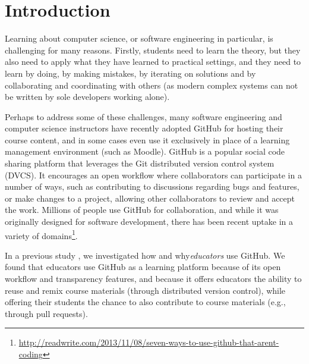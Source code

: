 \section{Introduction}


Learning about computer science, or software engineering in particular, is challenging for many reasons.  Firstly, students need to learn the theory, but they also need to apply what they have learned to practical settings, and they need to learn by doing, by making mistakes, by iterating on solutions and by collaborating and coordinating with others (as modern complex systems can not be written by sole developers working alone). 

Perhaps to address some of these challenges, many software engineering and computer science instructors have recently adopted GitHub for hosting their course content, and in some cases even use it exclusively in place of a learning management environment (such as Moodle).
%
GitHub is a popular social code sharing platform that leverages the Git distributed version control system (DVCS). It encourages an open workflow where collaborators can participate in a number of ways, such as contributing to discussions regarding bugs and features, or make changes to a project, allowing other collaborators to review and accept the work.  Millions of people use GitHub for collaboration, and while it was originally designed for software development, there has been recent uptake in a variety of domains\footnote{\url{http://readwrite.com/2013/11/08/seven-ways-to-use-github-that-arent-coding}}. 

 In a previous study \cite{zagalsky2015emergence}, we investigated how and why\emph{educators} use GitHub. We found that educators use GitHub as a learning platform because of its open workflow and transparency features, and because it offers educators the ability to reuse and remix course materials (through distributed version control), while offering their students the chance to also contribute to course materials (e.g., through pull requests). 
 
